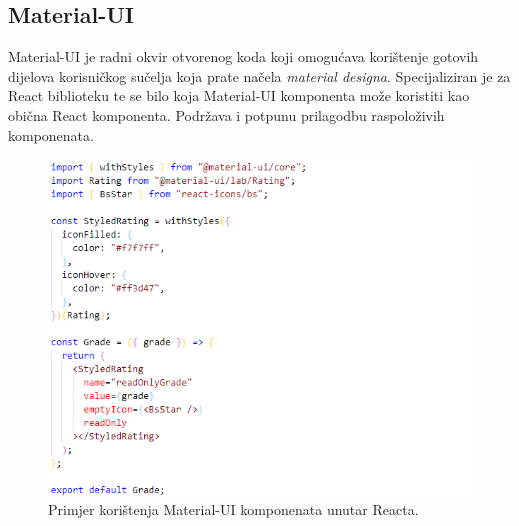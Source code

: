 \documentclass[times, utf8, zavrsni, numeric]{fer}
\begin{document}
			\subsection{Material-UI}
			Material-UI\cite{materialUI2021} je radni okvir otvorenog koda koji omogućava korištenje gotovih dijelova korisničkog sučelja koja prate načela \textit{material designa}. Specijaliziran je za React biblioteku te se bilo koja Material-UI komponenta može koristiti kao obična React komponenta. Podržava i potpunu prilagodbu raspoloživih komponenata.
			\begin{figure}[H]
				\centering
				\includegraphics[scale=0.75]{pictures/prikazi/MaterialUI.png}
				\caption{Primjer korištenja Material-UI komponenata unutar Reacta.}
				\label{fig:materialUI}
			\end{figure}
			
\end{document}
